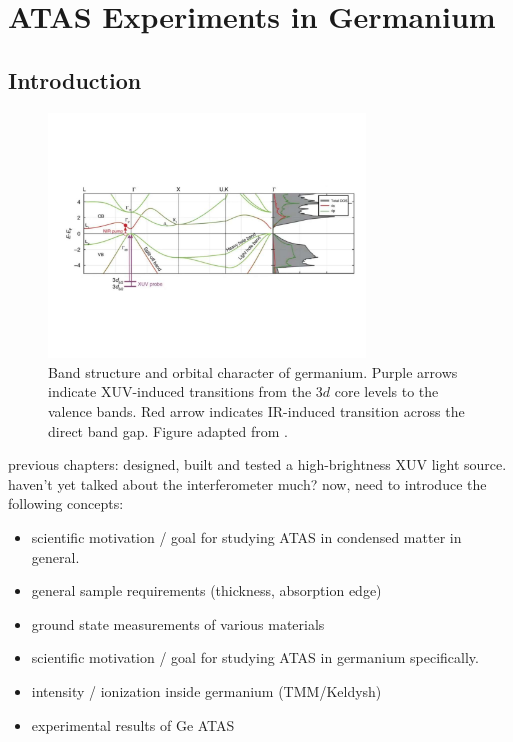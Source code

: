 \chapter{ATAS Experiments in Germanium}

\section{Introduction}







\begin{figure}
	\centering
	\includegraphics[width=0.75\textwidth]{figures/chap4/Ge_band_diagram_Zurch2017.pdf}
	\caption{Band structure and orbital character of germanium. Purple arrows indicate XUV-induced transitions from the $3d$ core levels to the valence bands. Red arrow indicates IR-induced transition across the direct band gap. Figure adapted from \cite{zurchDirectSimultaneousObservation2017}.}
	\label{fig:Ge_band_diagram}
\end{figure}

previous chapters: designed, built and tested a high-brightness XUV light source. haven't yet talked about the interferometer much? now, need to introduce the following concepts:
\begin{itemize}
	\item scientific motivation / goal for studying ATAS in condensed matter in general.
	\item general sample requirements (thickness, absorption edge)
	\item ground state measurements of various materials
	\item scientific motivation / goal for studying ATAS in germanium specifically.
	\item intensity / ionization inside germanium (TMM/Keldysh)
	\item experimental results of Ge ATAS

\end{itemize}

